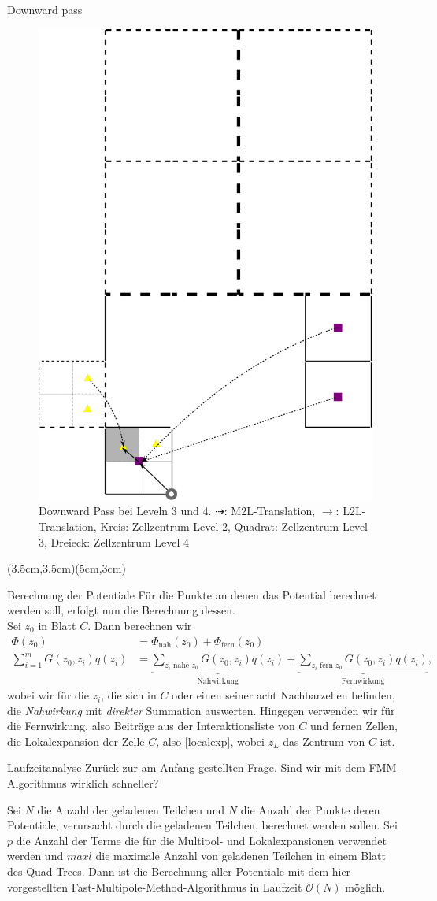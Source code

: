 \documentclass[ngerman]{beamer}
\begin{document}
\begin{frame}{Downward pass}
\begin{figure}
\includegraphics[height=0.5\textwidth]{downpass2.png}
\caption{Downward Pass bei Leveln 3 und 4. $\dashrightarrow$: M2L-Translation, $\rightarrow$: L2L-Translation, Kreis: Zellzentrum Level 2, Quadrat: Zellzentrum Level 3, Dreieck: Zellzentrum Level 4}
\end{figure}
(3.5cm,3.5cm)(5cm,3cm)
\end{frame}

\begin{frame}{Berechnung der Potentiale}
Für die Punkte an denen das Potential berechnet werden soll, erfolgt nun die Berechnung dessen.\\
Sei $z_0$ in Blatt $C$.
Dann berechnen wir 
\begin{align*}
\Phi(z_0) &= \Phi_{\text{nah}}(z_0) + \Phi_{\text{fern}}(z_0) &\\
\sum_{i=1}^m {G(z_0,z_i)q(z_i)} &= \underbrace{\sum_{z_i\text{ nahe } z_0 } G(z_0,z_i)q(z_i)}_{\text{Nahwirkung}} + \underbrace{\sum_{z_i\text{ fern }z_0} G(z_0,z_i)q(z_i)}_\text{Fernwirkung},
\end{align*}
wobei wir für die $z_i$, die sich in $C$ oder einen seiner acht Nachbarzellen befinden, die \emph{Nahwirkung} mit \emph{direkter} Summation auswerten. Hingegen verwenden wir für die Fernwirkung, also Beiträge aus der Interaktionsliste von $C$ und fernen Zellen, die Lokalexpansion der Zelle $C$, also \eqref{localexp}, wobei $z_L$ das Zentrum von $C$ ist.
\end{frame}

\begin{frame}{Laufzeitanalyse}
Zurück zur am Anfang gestellten Frage. Sind wir mit dem FMM-Algorithmus wirklich schneller?
\begin{Satz}
Sei $N$ die Anzahl der geladenen Teilchen und $N$ die Anzahl der Punkte deren Potentiale, verursacht durch die geladenen Teilchen, berechnet werden sollen. Sei $p$ die Anzahl der Terme die für die Multipol- und Lokalexpansionen verwendet werden und $maxl$ die maximale Anzahl von geladenen Teilchen in einem Blatt des Quad-Trees. Dann ist die Berechnung aller Potentiale mit dem hier vorgestellten Fast-Multipole-Method-Algorithmus in Laufzeit $\mathcal{O}(N)$ möglich.
\end{Satz}
\end{frame}
\end{document}
